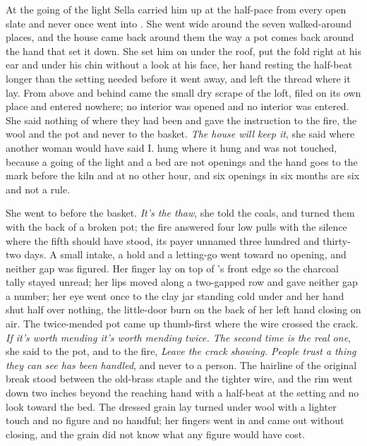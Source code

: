 \scenebreak

At the going of the light Sella carried him up at the half-pace from every open slate and never once went into . She went wide around the seven walked-around places, and the house came back around them the way a pot comes back around the hand that set it down. She set him on  under the roof, put the fold right at his ear and under his chin without a look at his face, her hand resting the half-beat longer than the setting needed before it went away, and left the thread where it lay. From above and behind came the small dry scrape of the loft, filed on its own place and entered nowhere; no interior was opened and no interior was entered. She said nothing of where they had been and gave the instruction to the fire, the wool and the pot and never to the basket. \emph{The house will keep it}, she said where another woman would have said I.  hung where it hung and was not touched, because a going of the light and a bed are not openings and the hand goes to the mark before the kiln and at no other hour, and six openings in six months are six and not a rule.

She went to  before the basket. \emph{It's the thaw}, she told the coals, and turned them with the back of a broken pot; the fire answered four low pulls with the silence where the fifth should have stood, its payer unnamed three hundred and thirty-two days. A small intake, a hold and a letting-go went toward no opening, and neither gap was figured. Her finger lay on top of 's front edge so the charcoal tally stayed unread; her lips moved along a two-gapped row and gave neither gap a number; her eye went once to the clay jar standing cold under  and her hand shut half over nothing, the little-door burn on the back of her left hand closing on air. The twice-mended pot came up thumb-first where the wire crossed the crack. \emph{If it's worth mending it's worth mending twice. The second time is the real one}, she said to the pot, and to the fire, \emph{Leave the crack showing. People trust a thing they can see has been handled}, and never to a person. The hairline of the original break stood between the old-brass staple and the tighter wire, and the rim went down two inches beyond the reaching hand with a half-beat at the setting and no look toward the bed. The dressed grain lay turned under wool with a lighter touch and no figure and no handful; her fingers went in and came out without closing, and the grain did not know what any figure would have cost.

